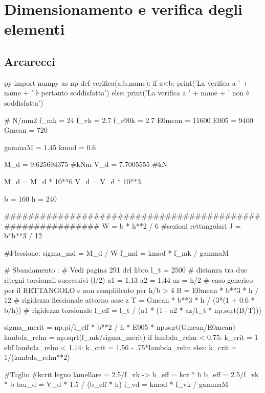 \chapter{Dimensionamento e verifica degli elementi}
\section{Arcarecci}

\begin{pythontexcustomcode}{py}
import numpy as np
def verifica(a,b,name):
    if a<b:
        print('La verifica a ' + name + ' è pertanto soddisfatta')
    else:
        print('La verifica a ' + name + ' non è soddisfatta')
\end{pythontexcustomcode}

\begin{pycode}
# N/mm2
f_mk = 24
f_vk = 2.7
f_c90k = 2.7
E0mean = 11600
E005 = 9400
Gmean = 720

gammaM = 1.45
kmod = 0.6

M_d = 9.625694375 #kNm
V_d = 7.7005555 #kN

M_d = M_d * 10**6 
V_d = V_d * 10**3 

b = 160
h = 240

###########################################################
W = b * h**2 / 6 #sezioni rettangolari
J = b*h**3 / 12

#Flessione:
sigma_md = M_d / W
f_md = kmod * f_mk / gammaM

# Sbandamento :
# Vedi pagina 291 del libro
l_t = 2500 # distanza tra due ritegni torsionali successivi (l/2)
a1 = 1.13
a2 = 1.44
az = h/2
# caso generico per il RETTANGOLO e non semplificato per h/b > 4
B = E0mean * b**3 * h / 12 # rigidezza flessionale attorno asse z
T = Gmean * b**3 * h / (3*(1 + 0.6 * b/h)) # rigidezza torsionale 
l_eff = l_t / (a1 * (1 - a2 * az/l_t * np.sqrt(B/T)))

sigma_mcrit = np.pi/l_eff * b**2 / h * E005 * np.sqrt(Gmean/E0mean)
lambda_relm = np.sqrt(f_mk/sigma_mcrit)
if lambda_relm < 0.75:
    k_crit = 1
elif lambda_relm < 1.14:
    k_crit = 1.56 - .75*lambda_relm
else:
    k_crit = 1/(lambda_relm**2)


#Taglio    
#kcrit legno lamellare = 2.5/f_vk -> b_eff = kcr * b
b_eff = 2.5/f_vk * b
tau_d = V_d * 1.5 / (b_eff * h)
f_vd = kmod * f_vk / gammaM
\end{pycode}

